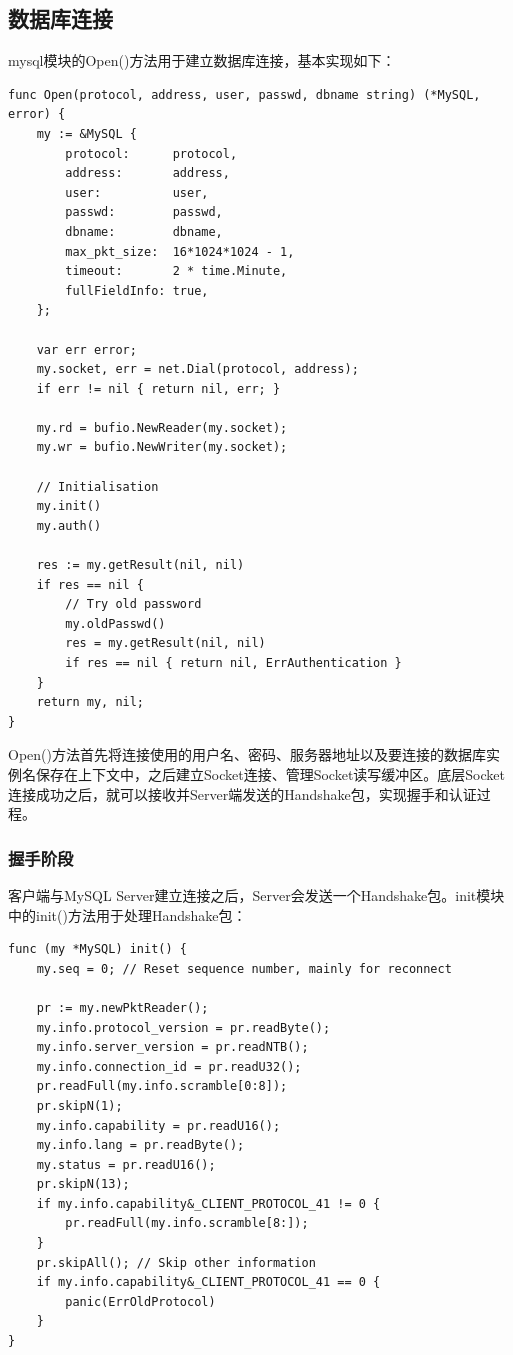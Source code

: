 \documentclass[a4paper, titlepage, 10pt, bookmark]{article}
\begin{document}
\subsection{数据库连接}
mysql模块的Open()方法用于建立数据库连接，基本实现如下：
\begin{spacing}{1.0}
\begin{lstlisting}
func Open(protocol, address, user, passwd, dbname string) (*MySQL, error) {
    my := &MySQL {
        protocol:      protocol,
        address:       address,
        user:          user,
        passwd:        passwd,
        dbname:        dbname,
        max_pkt_size:  16*1024*1024 - 1,
        timeout:       2 * time.Minute,
        fullFieldInfo: true,
    };

    var err error;
    my.socket, err = net.Dial(protocol, address);
    if err != nil { return nil, err; }

    my.rd = bufio.NewReader(my.socket);
    my.wr = bufio.NewWriter(my.socket);

    // Initialisation
    my.init()
    my.auth()

    res := my.getResult(nil, nil)
    if res == nil {
        // Try old password
        my.oldPasswd()
        res = my.getResult(nil, nil)
        if res == nil { return nil, ErrAuthentication }
    }
    return my, nil;
}
\end{lstlisting}
\end{spacing}
Open()方法首先将连接使用的用户名、密码、服务器地址以及要连接的数据库实例名保存在上下文中，之后建立Socket连接、管理Socket读写缓冲区。底层Socket连接成功之后，就可以接收并Server端发送的Handshake包，实现握手和认证过程。

\subsubsection{握手阶段}
客户端与MySQL Server建立连接之后，Server会发送一个Handshake包。init模块中的init()方法用于处理Handshake包：
\begin{spacing}{1.0}
\begin{lstlisting}
func (my *MySQL) init() {
    my.seq = 0; // Reset sequence number, mainly for reconnect

    pr := my.newPktReader();
    my.info.protocol_version = pr.readByte();
    my.info.server_version = pr.readNTB();
    my.info.connection_id = pr.readU32();
    pr.readFull(my.info.scramble[0:8]);
    pr.skipN(1);
    my.info.capability = pr.readU16();
    my.info.lang = pr.readByte();
    my.status = pr.readU16();
    pr.skipN(13);
    if my.info.capability&_CLIENT_PROTOCOL_41 != 0 {
        pr.readFull(my.info.scramble[8:]);
    }
    pr.skipAll(); // Skip other information
    if my.info.capability&_CLIENT_PROTOCOL_41 == 0 {
        panic(ErrOldProtocol)
    }
}
\end{lstlisting}
\end{spacing}
\end{document}
